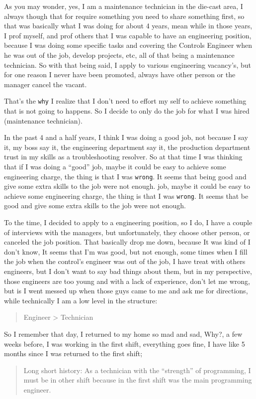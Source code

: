 \documentclass[11pt]{article}
\begin{document}
As you may wonder, yes, I am a maintenance technician in the die-cast area, I always though that for require something you need to share something first, so that was basically what I was doing for about 4 years, mean while in those years, I prof myself, and prof others that I was capable to have an engineering position, because I was doing some specific tasks and covering the Controls Engineer when he was out of the job, develop projects, etc, all of that being a maintenance technician. So with that being said, I apply to various engineering vacancy's, but for one reason I never have been promoted, always have other person or the manager cancel the vacant. 

That's the \texttt{why} I realize that I don't need to effort my self to achieve something that is not going  to happens. So I decide to only do the job for what I was hired (maintenance technician). 

In the past 4 and a half years, I think I was doing a good job, not because I say it, my boss say it, the engineering department say it, the production department trust in my skills as a troubleshooting resolver. So at that time I was thinking that if I was doing a “good” job, maybe it could be easy to achieve some engineering charge, the thing is that I was \texttt{wrong}. It seems that being good and give some extra skills to the job were not enough. job, maybe it could be easy to achieve some engineering charge, the thing is that I was \texttt{wrong}. It seems that be good and give some extra skills to the job were not enough.

To the time, I decided to apply to a engineering position, so I do, I have a couple of interviews with the managers, but unfortunately, they choose other person, or canceled the job position. That basically drop me down, because It was kind of I don't know, It seems that I'm was good, but not enough, some times when I fill the job when the control's engineer was out of the job, I have treat with others engineers, but I don't want to say bad things about them, but in my perspective, those engineers are too young and with a lack of experience, don't let me wrong, but is I went messed up when those guys came to me and ask me for directions, while technically I am a low level in the structure:
\begin{quote}
Engineer > Technician
\end{quote}

So I remember that day, I returned to my home so mad and sad, Why?, a few weeks before, I was working in the first shift, everything goes fine, I have like 5 months since I was returned to the first shift;
\begin{quote}
Long short history: As a technician with the “strength” of programming, I must be in other shift because in the first shift was the main programming engineer.
\end{quote}
\end{document}
